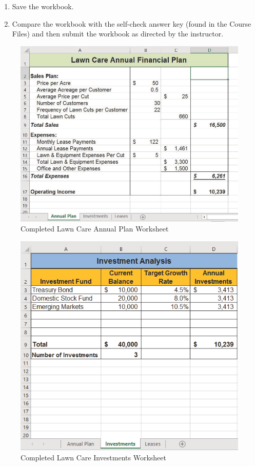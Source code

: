 \begin{enumerate}
	\item Save the  workbook.
	
	\item Compare the workbook with the self-check answer key (found in the Course Files) and then submit the  workbook as directed by the instructor.
\end{enumerate}

\begin{figure}[H]
	\centering
	\includegraphics[width=\maxwidth{.95\linewidth}]{gfx/ch02_fig47}
	\caption{Completed Lawn Care Annual Plan Worksheet}
	\label{02:fig47}
\end{figure}

\begin{figure}[H]
	\centering
	\includegraphics[width=\maxwidth{.95\linewidth}]{gfx/ch02_fig48}
	\caption{Completed Lawn Care Investments Worksheet}
	\label{02:fig48}
\end{figure}

